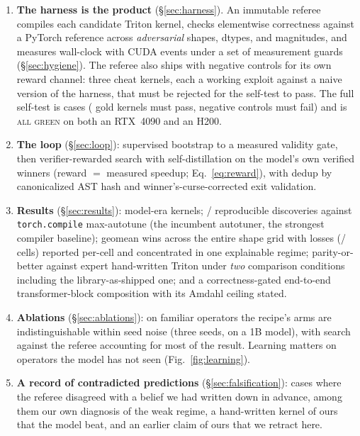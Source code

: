 \documentclass[10pt]{article}
\newcommand{\maxauto}{\texttt{torch.compile} max-autotune}
\begin{document}
\begin{enumerate}
\item \textbf{The harness is the product} (\S\ref{sec:harness}). An immutable referee
compiles each candidate Triton kernel, checks elementwise correctness against a PyTorch
reference across \emph{adversarial} shapes, dtypes, and magnitudes, and measures wall-clock
with CUDA events under a set of measurement guards (\S\ref{sec:hygiene}). The referee also
ships with negative controls for its own reward channel: three cheat kernels, each a working
exploit against a naive version of the harness, that must be rejected for the self-test to
pass. The full self-test is
\selftestCasesHTwoHundred{} cases (\selftestGoldHTwoHundred{} gold kernels must pass,
\selftestNegHTwoHundred{} negative controls must fail) and is \textsc{all green} on both
an RTX~4090 and an H200.

\item \textbf{The loop} (\S\ref{sec:loop}): supervised bootstrap to a measured validity
gate, then verifier-rewarded search with self-distillation on the model's own verified
winners (reward $=$ measured speedup; Eq.~\ref{eq:reward}), with dedup by canonicalized
AST hash and winner's-curse-corrected exit validation.

\item \textbf{Results} (\S\ref{sec:results}): \productKernels{} model-era kernels;
\stabDiscoveries{}/\stabOps{} reproducible discoveries against \maxauto{} (the incumbent
autotuner, the strongest compiler baseline); geomean wins across the entire
shape grid with losses (\gridLossesTotal{}/\gridCellsTotal{} cells) reported per-cell and
concentrated in one explainable regime; parity-or-better against expert hand-written
Triton under \emph{two} comparison conditions including the library-as-shipped one; and a
correctness-gated end-to-end transformer-block composition with its Amdahl ceiling stated.

\item \textbf{Ablations} (\S\ref{sec:ablations}): on familiar operators the recipe's arms
are indistinguishable within seed noise (three seeds, on a 1B model), with search against
the referee accounting for most of the result. Learning matters on operators the model has not
seen (Fig.~\ref{fig:learning}).

\item \textbf{A record of contradicted predictions} (\S\ref{sec:falsification}):
\falsifications{} cases where the referee disagreed with a belief we had written down in
advance, among them our own diagnosis of the weak regime, a hand-written kernel of ours that
the model beat, and an earlier claim of ours that we retract here.
\end{enumerate}
\end{document}
